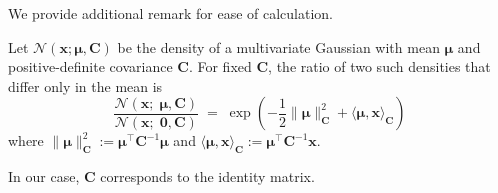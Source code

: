 We provide additional remark for ease of calculation.
\begin{remark}
    \label{remark:acceptance:gaussian ratio}
    Let $\mathcal{N}(\mathbf{x};\boldsymbol{\mu},\mathbf{C})$ be the
    density of a multivariate Gaussian with mean $\boldsymbol{\mu}$ and
    positive-definite covariance $\mathbf{C}$.  
    For fixed $\mathbf{C}$, the ratio of two such densities that differ
    only in the mean is
    \[
        \frac{\mathcal{N}(\mathbf{x};\;\boldsymbol{\mu},\mathbf{C})}
             {\mathcal{N}(\mathbf{x};\;\mathbf{0},\mathbf{C})}
        \;=\;
       \exp \left( -\frac{1}{2}\| \boldsymbol{\mu} \|^2_{\mathbf{C}} +\langle\boldsymbol{\mu}, \mathbf{x}\rangle_\mathbf{C}\right)
    \]
    where
    $\|\boldsymbol{\mu}\|_{\mathbf{C}}^{2}
        :=\boldsymbol{\mu}^{\!\top}\mathbf{C}^{-1}\boldsymbol{\mu}$ and
    $\langle\boldsymbol{\mu},\mathbf{x}\rangle_{\mathbf{C}}
        :=\boldsymbol{\mu}^{\!\top}\mathbf{C}^{-1}\mathbf{x}$.
\end{remark}
In our case, $\mathbf{C}$ corresponds to the identity matrix. 
